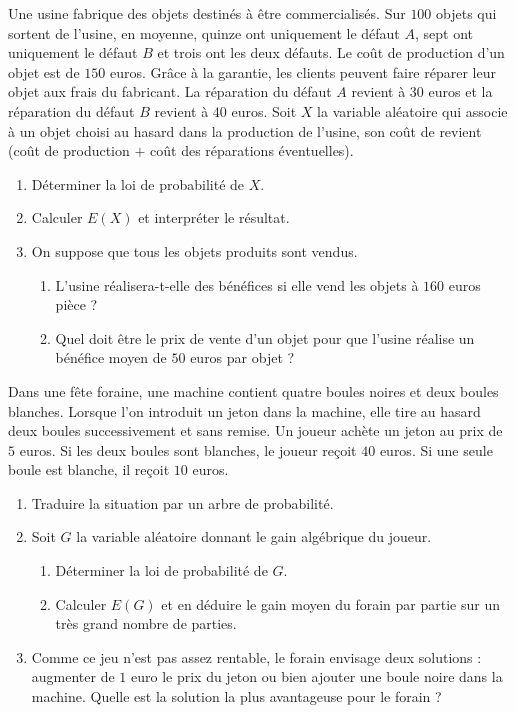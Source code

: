 \documentclass[11pt]{article}
\begin{document}
\begin{exo}
  Une usine fabrique des objets destinés à être commercialisés. Sur $100$ objets
  qui sortent de l'usine, en moyenne, quinze ont uniquement le défaut $A$, sept
  ont uniquement le défaut $B$ et trois ont les deux défauts. Le coût de
  production d'un objet est de $150$ euros. Gr\^ace à la garantie, les clients
  peuvent faire réparer leur objet aux frais du fabricant. La réparation du
  défaut $A$ revient à $30$ euros et la réparation du défaut $B$ revient à $40$
  euros. Soit $X$ la variable aléatoire qui associe à un objet choisi au hasard
  dans la production de l'usine, son coût de revient (coût de production $+$
  coût des réparations éventuelles).
  \begin{enumerate}
    \item Déterminer la loi de probabilité de $X$.
    \item Calculer $E(X)$ et interpréter le résultat.
    \item On suppose que tous les objets produits sont vendus.
      \begin{enumerate}
        \item L'usine réalisera-t-elle des bénéfices si elle vend les objets à
          $160$ euros pièce ?
        \item Quel doit être le prix de vente d'un objet pour que l'usine
          réalise un bénéfice moyen de $50$ euros par objet ?
      \end{enumerate}
  \end{enumerate}
\end{exo}

\begin{exo}
  Dans une fête foraine, une machine contient quatre boules noires et deux
  boules blanches. Lorsque l'on introduit un jeton dans la machine, elle tire au
  hasard deux boules successivement et sans remise. Un joueur achète un jeton au
  prix de $5$ euros. Si les deux boules sont blanches, le joueur reçoit $40$
  euros. Si une seule boule est blanche, il reçoit $10$ euros.
  \begin{enumerate}
    \item Traduire la situation par un arbre de probabilité.
    \item Soit $G$ la variable aléatoire donnant le gain algébrique du joueur.
      \begin{enumerate}
        \item Déterminer la loi de probabilité de $G$.
        \item Calculer $E(G)$ et en déduire le gain moyen du forain par partie
          sur un très grand nombre de parties.
      \end{enumerate}
    \item Comme ce jeu n'est pas assez rentable, le forain envisage deux
      solutions : augmenter de $1$ euro le prix du jeton ou bien ajouter
      une boule noire dans la machine. Quelle est la solution la plus
      avantageuse pour le forain ?
  \end{enumerate}
\end{exo}
\end{document}
